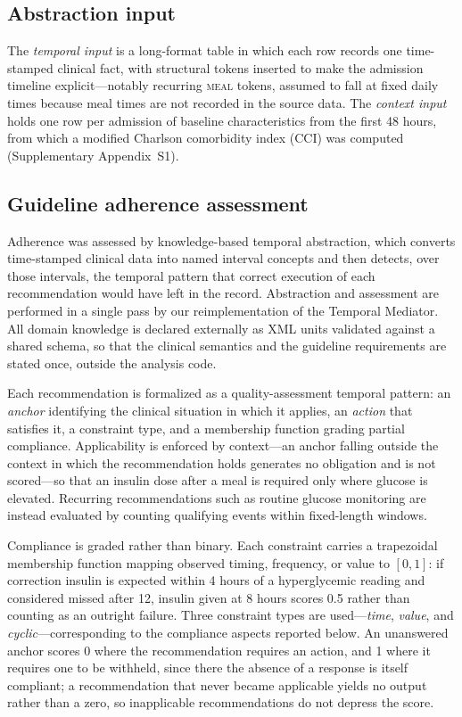 \subsection{Abstraction input}

The \emph{temporal input} is a long-format table in which each row records one
time-stamped clinical fact, with structural tokens inserted to make the
admission timeline explicit---notably recurring \textsc{meal} tokens, assumed
to fall at fixed daily times because meal times are not recorded in the source
data. The \emph{context input} holds one row per admission of baseline
characteristics from the first 48 hours, from which a modified Charlson
comorbidity index (CCI) was computed (Supplementary Appendix~S1).

\subsection{Guideline adherence assessment}

Adherence was assessed by knowledge-based temporal abstraction,\citep{shahar1997framework} which converts time-stamped clinical data into
named interval concepts and then detects, over those intervals, the temporal
pattern that correct execution of each recommendation would have left in the
record.\citep{ben2024supporting} Abstraction and assessment are performed in a
single pass by our reimplementation of the Temporal Mediator.\citep{mediator-github} All domain knowledge is declared externally as XML
units validated against a shared schema, so that the clinical semantics and the
guideline requirements are stated once, outside the analysis code.

Each recommendation is formalized as a quality-assessment temporal pattern: an
\emph{anchor} identifying the clinical situation in which it applies, an
\emph{action} that satisfies it, a constraint type, and a membership function
grading partial compliance. Applicability is enforced by context---an anchor
falling outside the context in which the recommendation holds generates no
obligation and is not scored---so that an insulin dose after a meal is required
only where glucose is elevated. Recurring recommendations such as routine
glucose monitoring are instead evaluated by counting qualifying events within
fixed-length windows.

Compliance is graded rather than binary. Each constraint carries a trapezoidal
membership function mapping observed timing, frequency, or value to $[0,1]$: if
correction insulin is expected within 4 hours of a hyperglycemic reading and
considered missed after 12, insulin given at 8 hours scores 0.5 rather than
counting as an outright failure. Three constraint types are
used---\emph{time}, \emph{value}, and \emph{cyclic}---corresponding to the
compliance aspects reported below. An unanswered anchor
scores 0 where the recommendation requires an action, and 1 where it requires
one to be withheld, since there the absence of a response is itself compliant;
a recommendation that never became applicable yields no output rather than a
zero, so inapplicable recommendations do not depress the score.

